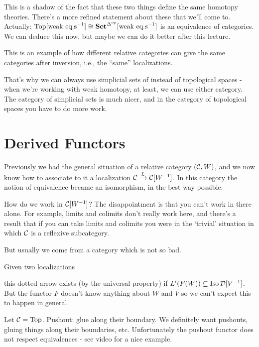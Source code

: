 \documentclass[class=report, crop=false,a4paper,twoside]{standalone}
\begin{document}
This is a shadow of the fact that these two things define the same homotopy theories. There's a more refined statement about these that we'll come to. Actually: $\operatorname{Top}[\text{weak eq.s}^{-1}] \cong \mathbf{Set}^{\Delta^{op}}[\text{weak eq.s}^{-1}]$ is an equivalence of categories. We can deduce this now, but maybe we can do it better after this lecture.

This is an example of how different relative categories can give the same categories after inversion, i.e., the ``same'' localizations. 

That's why we can always use simplicial sets of instead of topological spaces - when we're working with weak homotopy, at least, we can use either category. The category of simplicial sets is much nicer, and in the category of topological spaces you have to do more work.

\section{Derived Functors}
Previously we had the general situation of a relative category $(\mathcal{C},W)$, and we now know how to associate to it a localization $\mathcal{C} \xrightarrow{L} \mathcal{C}[W^{-1}]$. In this category the notion of equivalence became an isomorphism, in the best way possible.

How do we work in $\mathcal{C}[W^{-1}]$? The disappointment is that you can't work in there alone. For example, limits and colimits don't really work here, and there's a result that if you can take limits and colimits you were in the `trivial' situation in which $\mathcal{C}$ is a reflexive subcategory.

But usually we come from a category which is not so bad.

Given two localizations
\begin{center}
\end{center}
this dotted arrow exists (by the universal property) if $L'(F(W)) \subseteq \operatorname{Iso}\mathcal{D}[V^{-1}]$. But the functor $F$ doesn't know anything about $W$ and $V$ so we can't expect this to happen in general.

\begin{example}[(Colimits)]
	Let $\mathcal{C} = \operatorname{Top}$. Pushout: glue along their boundary. We definitely want pushouts, gluing things along their boundaries, etc. Unfortunately the pushout functor does not respect equivalences - see video for a nice example.
\end{example}
\end{document}
